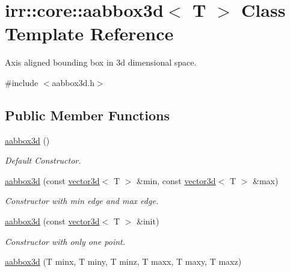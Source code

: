 \hypertarget{classirr_1_1core_1_1aabbox3d}{}\section{irr\+:\+:core\+:\+:aabbox3d$<$ T $>$ Class Template Reference}
\label{classirr_1_1core_1_1aabbox3d}


Axis aligned bounding box in 3d dimensional space.  




{\ttfamily \#include $<$aabbox3d.\+h$>$}

\subsection*{Public Member Functions}
\begin{DoxyCompactItemize}
\item 
\hyperlink{classirr_1_1core_1_1aabbox3d_aec7f681b248d9f0e07d62be0c921767e}{aabbox3d} ()\hypertarget{classirr_1_1core_1_1aabbox3d_aec7f681b248d9f0e07d62be0c921767e}{}\label{classirr_1_1core_1_1aabbox3d_aec7f681b248d9f0e07d62be0c921767e}

\begin{DoxyCompactList}\small\item\em Default Constructor. \end{DoxyCompactList}\item 
\hyperlink{classirr_1_1core_1_1aabbox3d_a7281018221a7c1070a5487cb98f2ac45}{aabbox3d} (const \hyperlink{classirr_1_1core_1_1vector3d}{vector3d}$<$ T $>$ \&min, const \hyperlink{classirr_1_1core_1_1vector3d}{vector3d}$<$ T $>$ \&max)\hypertarget{classirr_1_1core_1_1aabbox3d_a7281018221a7c1070a5487cb98f2ac45}{}\label{classirr_1_1core_1_1aabbox3d_a7281018221a7c1070a5487cb98f2ac45}

\begin{DoxyCompactList}\small\item\em Constructor with min edge and max edge. \end{DoxyCompactList}\item 
\hyperlink{classirr_1_1core_1_1aabbox3d_a1e1b49cb756eab5ba6dec051a6fa27c8}{aabbox3d} (const \hyperlink{classirr_1_1core_1_1vector3d}{vector3d}$<$ T $>$ \&init)\hypertarget{classirr_1_1core_1_1aabbox3d_a1e1b49cb756eab5ba6dec051a6fa27c8}{}\label{classirr_1_1core_1_1aabbox3d_a1e1b49cb756eab5ba6dec051a6fa27c8}

\begin{DoxyCompactList}\small\item\em Constructor with only one point. \end{DoxyCompactList}\item 
\hyperlink{classirr_1_1core_1_1aabbox3d_af73ac9adeaae3abf8afaeb5f6be4a52c}{aabbox3d} (T minx, T miny, T minz, T maxx, T maxy, T maxz)\hypertarget{classirr_1_1core_1_1aabbox3d_af73ac9adeaae3abf8afaeb5f6be4a52c}{}\label{classirr_1_1core_1_1aabbox3d_af73ac9adeaae3abf8afaeb5f6be4a52c}


\end{DoxyCompactItemize}
